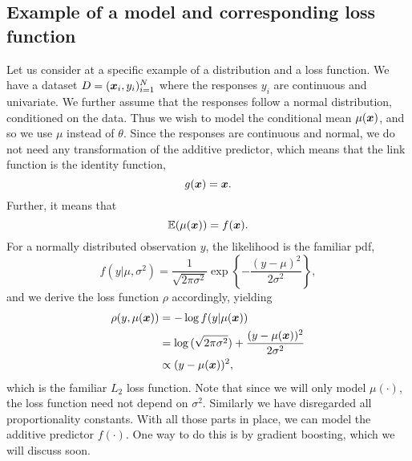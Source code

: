 \subsection{Example of a model and corresponding loss function}\label{subsec:model-example}
Let us consider at a specific example of a distribution and a loss function.
We have a dataset $D=(\bm{x}_i,y_i)_{i=1}^N$ where the responses $y_i$ are continuous and univariate.
We further assume that the responses follow a normal distribution, conditioned on the data.
Thus we wish to model the conditional mean $\mu(\bm{x})$, and so we use $\mu$ instead of $\theta$.
Since the responses are continuous and normal, we do not need any transformation of the additive predictor, which means that the link function is the identity function,
\begin{equation*}
    g(\bm{x})=\bm{x}.
\end{equation*}
Further, it means that
\begin{equation*}
    \mathbb{E}(\mu(\bm{x}))=f(\bm{x}).
\end{equation*}
For a normally distributed observation $y$, the likelihood is the familiar pdf,
\begin{equation*}
    f(y|\mu,\sigma^2)=\frac{1}{\sqrt{2\pi\sigma^2}}\exp\left\{-\frac{(y-\mu)^2}{2\sigma^2}\right\},
\end{equation*}
and we derive the loss function $\rho$ accordingly, yielding
\begin{align*}
    \rho(y,\mu(\bm{x}))&=-\log{f(y|\mu(\bm{x}))}\\
    &=\log{(\sqrt{2\pi\sigma^2})}+\frac{(y-\mu(\bm{x}))^2}{2\sigma^2} \\
    &\propto(y-\mu(\bm{x}))^2,
\end{align*}
which is the familiar $L_2$ loss function. Note that since we will only model $\mu(\cdot)$, the loss function need not depend on $\sigma^2$.
Similarly we have disregarded all proportionality constants.
With all those parts in place, we can model the additive predictor $f(\cdot)$.
One way to do this is by gradient boosting, which we will discuss soon.

